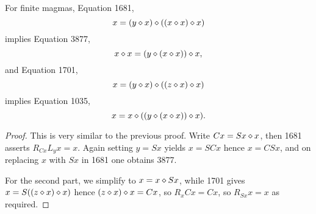 \begin{proposition}\label{1681-3877-1701-1035}\leanok{}
  For finite magmas, Equation 1681,
$$ x = (y \diamond x) \diamond ((x \diamond x) \diamond x)$$
implies Equation 3877,
$$ x \diamond x = (y \diamond (x \diamond x)) \diamond x,$$
and Equation 1701,
$$ x = (y \diamond x) \diamond ((z \diamond x) \diamond x)$$
implies Equation 1035,
$$ x = x \diamond ((y \diamond (x \diamond x)) \diamond x).$$
\end{proposition}

\begin{proof}\leanok This is very similar to the previous proof.
  Write $Cx = Sx \diamond x$, then 1681 asserts $R_{Cx} L_y x = x$.  Again setting $y=Sx$ yields $x=SCx$ hence $x = CSx$, and on replacing $x$ with $Sx$ in 1681 one obtains 3877.

For the second part, we simplify to $x = x \diamond Sx$, while 1701 gives $x = S((z \diamond x) \diamond x)$ hence $(z \diamond x) \diamond x = Cx$, so $R_x Cx = Cx$, so $R_{Sx} x = x$ as required.
\end{proof}
